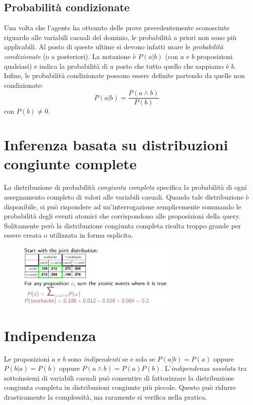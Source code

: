 \documentclass[11pt,oneside]{book}
\begin{document}
\subsection{Probabilità condizionate}
Una volta che l'agente ha ottenuto delle prove precedentemente sconosciute riguardo alle variabili casuali del dominio, le probabilità a priori non sono più applicabili. Al posto di queste ultime si devono infatti usare le \textit{probabilità condizionate} (o a posteriori). La notazione è $P(a|b)$ (con $a$ e $b$ proposizioni qualsiasi) e indica la probabilità di $a$ posto che tutto quello che sappiamo è $b$. Infine, le probabilità condizionate possono essere definite partendo da quelle non condizionate:
\[ P(a|b) = \frac{P(a \wedge b)}{P(b)} \]
con $P(b) \neq 0$.

\section{Inferenza basata su distribuzioni congiunte complete}
La distribuzione di probabilità \textit{congiunta completa} specifica la probabilità di ogni assegnamento completo di valori alle variabili casuali. Quando tale distribuzione è disponibile, si può rispondere ad un'interrogazione semplicemente sommando le probabilità degli eventi atomici che corrispondono alle proposizioni della query. Solitamente però la distribuzione congiunta completa risulta troppo grande per essere creata o utilizzata in forma esplicita.
\begin{figure}[htp]
	\centering
	\includegraphics[width=0.7\textwidth]{inference.png}
\end{figure}

\section{Indipendenza}
Le proposizioni $a$ e $b$ sono \textit{indipendenti} se e solo se $P(a|b) = P(a)$ oppure $P(b|a) = P(b)$ oppure $P(a \wedge b) = P(a)P(b)$. L'\textit{indipendenza assoluta} tra sottoinsiemi di variabili casuali può consentire di fattorizzare la distribuzione congiunta completa in distribuzioni congiunte più piccole. Questo può ridurre drasticamente la complessità, ma raramente si verifica nella pratica.
\end{document}
